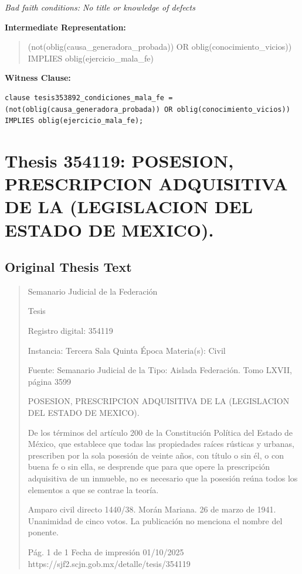 \documentclass[11pt,a4paper]{article}
\begin{document}
\textit{Bad faith conditions: No title or knowledge of defects}

\textbf{Intermediate Representation:}

\begin{quote}
(not(oblig(causa\_generadora\_probada)) OR oblig(conocimiento\_vicios)) IMPLIES oblig(ejercicio\_mala\_fe)
\end{quote}

\textbf{Witness Clause:}

\begin{lstlisting}[style=witnessstyle, language=Witness]
clause tesis353892_condiciones_mala_fe = (not(oblig(causa_generadora_probada)) OR oblig(conocimiento_vicios)) IMPLIES oblig(ejercicio_mala_fe);
\end{lstlisting}

\newpage

\section{Thesis 354119: POSESION, PRESCRIPCION ADQUISITIVA DE LA (LEGISLACION DEL ESTADO DE MEXICO).}
\label{thesis:354119}

\subsection{Original Thesis Text}

\begin{quote}
                                                   Semanario Judicial de la Federación

                                                  Tesis

 Registro digital: 354119

 Instancia: Tercera Sala           Quinta Época                          Materia(s): Civil

                                   Fuente: Semanario Judicial de la      Tipo: Aislada
                                   Federación.
                                   Tomo LXVII, página 3599


POSESION, PRESCRIPCION ADQUISITIVA DE LA (LEGISLACION DEL ESTADO DE MEXICO).


De los términos del artículo 200 de la Constitución Política del Estado de México, que establece que
todas las propiedades raíces rústicas y urbanas, prescriben por la sola posesión de veinte años, con
título o sin él, o con buena fe o sin ella, se desprende que para que opere la prescripción adquisitiva
de un inmueble, no es necesario que la posesión reúna todos los elementos a que se contrae la
teoría.


Amparo civil directo 1440/38. Morán Mariana. 26 de marzo de 1941. Unanimidad de cinco votos. La
publicación no menciona el nombre del ponente.




                                              Pág. 1 de 1             Fecha de impresión 01/10/2025
  https://sjf2.scjn.gob.mx/detalle/tesis/354119

\end{quote}
\end{document}
